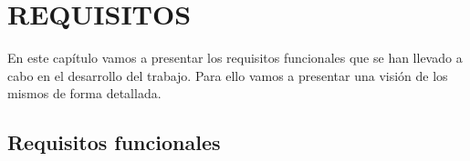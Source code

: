 
\chapter{REQUISITOS}  

En este capítulo vamos a presentar los requisitos funcionales que se han llevado a cabo en el desarrollo del trabajo. Para ello vamos a presentar una visión de los mismos de forma detallada.

\section{Requisitos funcionales}

